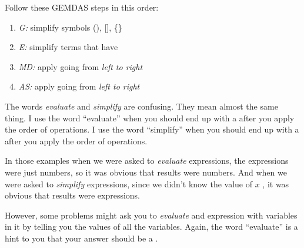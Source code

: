 \documentclass[fleqn,letterpaper,12pt,printwatermark=false]{memoir}
\begin{document}
\begin{myKeyConcepts}
    Follow these GEMDAS steps in this order:
    \begin{enumerate}
        \item {\Large\slshape G:} simplify  symbols (), [], \{\} 
        \item {\Large\slshape E:} simplify terms that have 
        \item {\Large\slshape MD:} apply  going from \emph{left to right}
        \item {\Large\slshape AS:} apply  going from \emph{left to right}
    \end{enumerate}
    The words \emph{evaluate} and \emph{simplify} are confusing. 
    They mean almost the same thing.
    I use the word ``evaluate'' when you should end up with a  after you apply the order of operations.
    I use the word ``simplify'' when you should end up with a  after you apply the order of operations.
\end{myKeyConcepts}





In those examples
when we were asked to \emph{evaluate} expressions,
the expressions were just numbers, 
so it was obvious that results were numbers.
And 
when we were asked to \emph{simplify} expressions,
since we didn't know the value of $x$ ,
it was obvious that results were expressions.

However, some problems might ask you to \emph{evaluate} and expression
with variables in it 
by telling you the values of all the variables.
Again, the word ``evaluate'' is a hint to you that your answer should be a .

\end{document}
